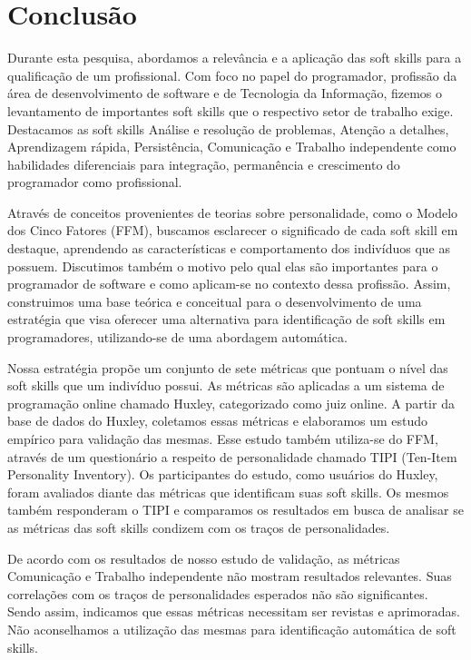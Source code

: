 

\chapter{Conclusão}

\label{chap:conclusion}

Durante esta pesquisa, abordamos a relevância e a aplicação das soft skills para a qualificação de um profissional. Com foco no papel do programador, profissão da área de desenvolvimento de software e de Tecnologia da Informação, fizemos o levantamento de importantes soft skills que o respectivo setor de trabalho exige. Destacamos as soft skills Análise e resolução de problemas, Atenção a detalhes, Aprendizagem rápida, Persistência, Comunicação e Trabalho independente como habilidades diferenciais para integração, permanência e crescimento do programador como profissional.

Através de conceitos provenientes de teorias sobre personalidade, como o Modelo dos Cinco Fatores (FFM), buscamos esclarecer o significado de cada soft skill em destaque, aprendendo as características e comportamento dos indivíduos que as possuem. Discutimos também o motivo pelo qual elas são importantes para o programador de software e como aplicam-se no contexto dessa profissão. Assim, construimos uma base teórica e conceitual para o desenvolvimento de uma estratégia que visa oferecer uma alternativa para identificação de soft skills em programadores, utilizando-se de uma abordagem automática.

Nossa estratégia propõe um conjunto de sete métricas que pontuam o nível das soft skills que um indivíduo possui. As métricas são aplicadas a um sistema de programação online chamado Huxley, categorizado como juiz online. A partir da base de dados do Huxley, coletamos essas métricas e elaboramos um estudo empírico para validação das mesmas. Esse estudo também utiliza-se do FFM, através de um questionário a respeito de personalidade chamado TIPI (Ten-Item Personality Inventory). Os participantes do estudo, como usuários do Huxley, foram avaliados diante das métricas que identificam suas soft skills. Os mesmos também responderam o TIPI e comparamos os resultados em busca de analisar se as métricas das soft skills condizem com os traços de personalidades.

De acordo com os resultados de nosso estudo de validação, as métricas Comunicação e Trabalho independente não mostram resultados relevantes. Suas correlações com os traços de personalidades esperados não são significantes. Sendo assim, indicamos que essas métricas necessitam ser revistas e aprimoradas. Não aconselhamos a utilização das mesmas para identificação automática de soft skills.


